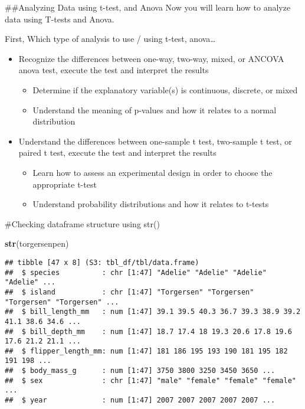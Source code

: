 \documentclass[
]{article}
\newenvironment{Shaded}{\begin{snugshade}}{\end{snugshade}}
\newcommand{\FunctionTok}[1]{\textcolor[rgb]{0.13,0.29,0.53}{\textbf{#1}}}
\newcommand{\NormalTok}[1]{#1}
\providecommand{\tightlist}{%
  \setlength{\itemsep}{0pt}\setlength{\parskip}{0pt}}
\begin{document}
\#\#Analyzing Data using t-test, and Anova Now you will learn how to
analyze data using T-tests and Anova.

First, Which type of analysis to use / using t-test, anova\ldots{}

\begin{itemize}
\tightlist
\item
  Recognize the differences between one-way, two-way, mixed, or ANCOVA
  anova test, execute the test and interpret the results

  \begin{itemize}
  \tightlist
  \item
    Determine if the explanatory variable(s) is continuous, discrete, or
    mixed
  \item
    Understand the meaning of p-values and how it relates to a normal
    distribution
  \end{itemize}
\item
  Understand the differences between one-sample t test, two-sample t
  test, or paired t test, execute the test and interpret the results

  \begin{itemize}
  \tightlist
  \item
    Learn how to assess an experimental design in order to choose the
    appropriate t-test
  \item
    Understand probability distributions and how it relates to t-tests
  \end{itemize}
\end{itemize}

\#Checking dataframe structure using str()

\begin{Shaded}
\begin{Highlighting}[]
\FunctionTok{str}\NormalTok{(torgersenpen)}
\end{Highlighting}
\end{Shaded}

\begin{verbatim}
## tibble [47 x 8] (S3: tbl_df/tbl/data.frame)
##  $ species          : chr [1:47] "Adelie" "Adelie" "Adelie" "Adelie" ...
##  $ island           : chr [1:47] "Torgersen" "Torgersen" "Torgersen" "Torgersen" ...
##  $ bill_length_mm   : num [1:47] 39.1 39.5 40.3 36.7 39.3 38.9 39.2 41.1 38.6 34.6 ...
##  $ bill_depth_mm    : num [1:47] 18.7 17.4 18 19.3 20.6 17.8 19.6 17.6 21.2 21.1 ...
##  $ flipper_length_mm: num [1:47] 181 186 195 193 190 181 195 182 191 198 ...
##  $ body_mass_g      : num [1:47] 3750 3800 3250 3450 3650 ...
##  $ sex              : chr [1:47] "male" "female" "female" "female" ...
##  $ year             : num [1:47] 2007 2007 2007 2007 2007 ...
\end{verbatim}
\end{document}
